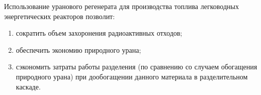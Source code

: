 Использование уранового регенерата для производства топлива легководных энергетических реакторов позволит: 
\begin{enumerate}
  \item сократить объем захоронения радиоактивных отходов; 
  \item обеспечить экономию природного урана;
  \item сэкономить затраты работы разделения (по сравнению со случаем обогащения природного урана) при дообогащении данного материала в разделительном каскаде. 
\end{enumerate}
